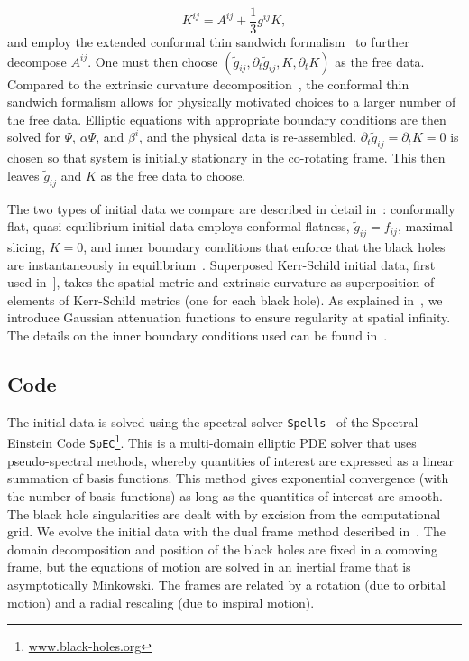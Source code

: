 \begin{equation}
K^{ij}=A^{ij}+\frac{1}{3}g^{ij}K,
\end{equation}
and employ the extended conformal thin sandwich formalism~\citep{York1999,Pfeiffer2003b} to further
decompose $A^{ij}$.  One must then choose
$\left(\tilde{g}_{ij},\partial_{t}\tilde{g}_{ij},K,\partial_{t}K\right)$
as the free data. Compared to the extrinsic curvature decomposition~\citep{Murchadha-York:1974b}, the conformal thin sandwich formalism allows for 
physically motivated choices to a larger number of the free data.  Elliptic equations
with appropriate boundary conditions are then solved for $\Psi$,
$\alpha\Psi$, and $\beta^i$, and the physical data is
re-assembled. $\partial_t\tilde{g}_{ij} = \partial_tK = 0$ is chosen
so that system is initially stationary in the co-rotating
frame.  This then leaves $\tilde{g}_{ij}$ and $K$ as the free data to
choose.  

The two types of initial data we compare are described in detail in~\cite{Lovelace2008}: conformally flat, quasi-equilibrium initial
data employs conformal flatness, $\tilde{g}_{ij}=f_{ij}$, maximal
slicing, $K=0$, and inner
boundary conditions that enforce that the black holes are
instantaneously in
equilibrium~\citep{Caudill-etal:2006,Cook2004,Cook2002}.  Superposed
Kerr-Schild initial data, first used
in~\citep{Marronetti-Matzner:2000,Matzner1999}\big], takes the spatial
metric and extrinsic curvature as superposition of elements of
Kerr-Schild metrics (one for each black hole).  As explained in~\cite{Lovelace2008}, we introduce Gaussian attenuation functions
to ensure regularity at spatial infinity. The details on the inner
boundary conditions used can be found in~\cite{Lovelace2008}.


\subsection{Code}
\label{sec:Code}

The initial data is solved using the spectral solver {\tt Spells}~\citep{Pfeiffer2003} of the Spectral 
 Einstein Code {\tt SpEC}\footnote{\url{www.black-holes.org}}. This is a
multi-domain elliptic PDE solver that uses pseudo-spectral methods,
whereby quantities of interest are expressed as a linear summation of
basis functions. This method gives exponential convergence (with the
number of basis functions) as long as the quantities of interest are
smooth. The black hole singularities are dealt with by excision from
the computational grid. We evolve the initial data with the dual frame method described in~\cite{Scheel2006}. The domain decomposition and position of the black
holes are fixed in a comoving frame, but the equations of motion are
solved in an inertial frame that is asymptotically Minkowski. The
frames are related by a rotation (due to orbital motion) and a
radial rescaling (due to inspiral motion).

